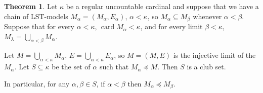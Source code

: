 \documentclass[12pt]{report}
\newcommand{\card}{\operatorname{card}}
\theoremstyle{definition}
\newtheorem{theorem}{Theorem}[chapter]
\begin{document}
\begin{theorem}
Let $\kappa$ be a regular uncountable cardinal and suppose that we have a chain of LST-models $M_\alpha = (M_\alpha, E_\alpha)$, $\alpha < \kappa$, so $M_\alpha \subseteq M_\beta$ whenever $\alpha < \beta$. Suppose that for every $\alpha < \kappa$, $\card M_\alpha < \kappa$, and for every limit $\beta < \kappa$, $M_\lambda = \bigcup_{\alpha < \beta} M_\alpha$.

Let $M = \bigcup_{\alpha < \kappa} M_\alpha$, $E = \bigcup_{\alpha < \kappa} E_\alpha$, so $M = (M, E)$ is the injective limit of the $M_\alpha$. Let $S \subseteq \kappa$ be the set of $\alpha$ such that $M_\alpha \preceq M$. Then $S$ is a club set.

In particular, for any $\alpha, \beta \in S$, if $\alpha < \beta$ then $M_\alpha \preceq M_\beta$.
\end{theorem}
\end{document}
